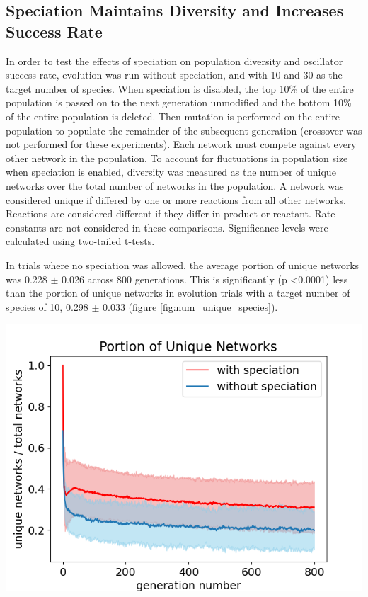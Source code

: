 \documentclass[12pt]{report}
\begin{document}
\subsection{Speciation Maintains Diversity and Increases Success Rate}
\label{section:speciation}
In order to test the effects of speciation on population diversity and oscillator success rate, evolution was run without speciation, and with 10 and 30 as the target number of species. When speciation is disabled, the top 10\% of the entire population is passed on to the next generation unmodified and the bottom 10\% of the entire population is deleted. Then mutation is performed on the entire population to populate the remainder of the subsequent generation (crossover was not performed for these experiments). Each network must compete against every other network in the population. To account for fluctuations in population size when speciation is enabled, diversity was measured as the number of unique networks over the total number of networks in the population. A network was considered unique if differed by one or more reactions from all other networks. Reactions are considered different if they differ in product or reactant. Rate constants are not considered in these comparisons. Significance levels were calculated using two-tailed t-tests. 

In trials where no speciation was allowed, the average portion of unique networks was 0.228 $\pm$ 0.026 across 800 generations. This is significantly (p \textless 0.0001) less than the portion of unique networks in evolution trials with a target number of species of 10, 0.298 $\pm$ 0.033 (figure \ref{fig:num_unique_species}).

\begin{center}
    \includegraphics[width=18cm]{images/num_unique_networks.png}
    \label{fig:num_unique_species}
\end{center}
\end{document}
